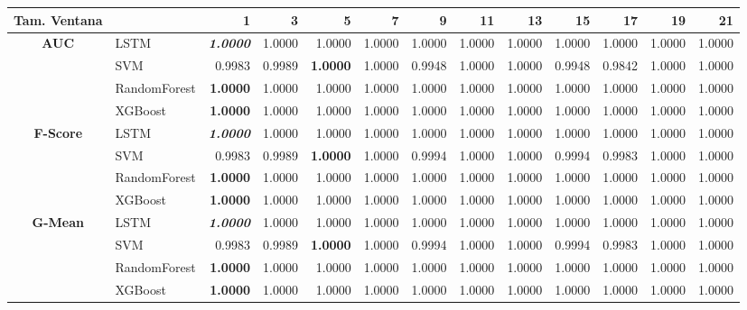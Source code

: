 \begin{table}[H]
	\centering
	\begin{adjustbox}{max width=12cm}
		\begin{tabular}{|c|l|r|r|r|r|r|r|r|r|r|r|r|}
			\hline
			\textbf{Tam. Ventana}&         &      1  &      3  &   5  &   7  &      9  &   11 &   13 &      15 &      17 &   19 &   21 \\
			\hline
			\textbf{AUC} &  LSTM & \textit{ \textbf{  1.0000 } } &  1.0000 &  1.0000 &  1.0000 &  1.0000 &  1.0000 &  1.0000 &  1.0000 &  1.0000 &  1.0000 &  1.0000 \\
			&  SVM &  0.9983 &  0.9989 & \textbf{  1.0000 } &  1.0000 &  0.9948 &  1.0000 &  1.0000 &  0.9948 &  0.9842 &  1.0000 &  1.0000 \\
			&  RandomForest & \textbf{  1.0000 } &  1.0000 &  1.0000 &  1.0000 &  1.0000 &  1.0000 &  1.0000 &  1.0000 &  1.0000 &  1.0000 &  1.0000 \\
			&  XGBoost & \textbf{  1.0000 } &  1.0000 &  1.0000 &  1.0000 &  1.0000 &  1.0000 &  1.0000 &  1.0000 &  1.0000 &  1.0000 &  1.0000 \\
			\hline
			\textbf{F-Score} &  LSTM & \textit{ \textbf{  1.0000 } } &  1.0000 &  1.0000 &  1.0000 &  1.0000 &  1.0000 &  1.0000 &  1.0000 &  1.0000 &  1.0000 &  1.0000 \\
			&  SVM &  0.9983 &  0.9989 & \textbf{  1.0000 } &  1.0000 &  0.9994 &  1.0000 &  1.0000 &  0.9994 &  0.9983 &  1.0000 &  1.0000 \\
			&  RandomForest & \textbf{  1.0000 } &  1.0000 &  1.0000 &  1.0000 &  1.0000 &  1.0000 &  1.0000 &  1.0000 &  1.0000 &  1.0000 &  1.0000 \\
			&  XGBoost & \textbf{  1.0000 } &  1.0000 &  1.0000 &  1.0000 &  1.0000 &  1.0000 &  1.0000 &  1.0000 &  1.0000 &  1.0000 &  1.0000 \\
			\hline
			\textbf{G-Mean} &  LSTM & \textit{ \textbf{  1.0000 } } &  1.0000 &  1.0000 &  1.0000 &  1.0000 &  1.0000 &  1.0000 &  1.0000 &  1.0000 &  1.0000 &  1.0000 \\
			&  SVM &  0.9983 &  0.9989 & \textbf{  1.0000 } &  1.0000 &  0.9994 &  1.0000 &  1.0000 &  0.9994 &  0.9983 &  1.0000 &  1.0000 \\
			&  RandomForest & \textbf{  1.0000 } &  1.0000 &  1.0000 &  1.0000 &  1.0000 &  1.0000 &  1.0000 &  1.0000 &  1.0000 &  1.0000 &  1.0000 \\
			&  XGBoost & \textbf{  1.0000 } &  1.0000 &  1.0000 &  1.0000 &  1.0000 &  1.0000 &  1.0000 &  1.0000 &  1.0000 &  1.0000 &  1.0000 \\

\end{tabular}
\end{adjustbox}
\end{table}
